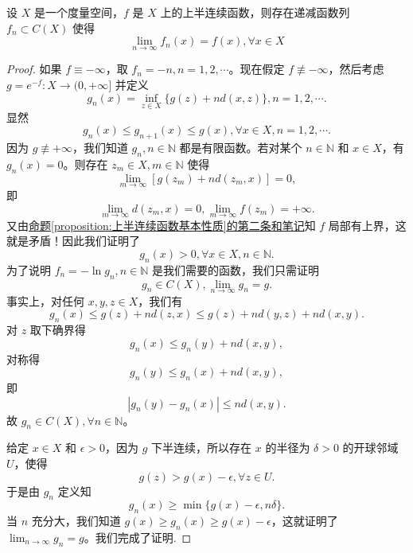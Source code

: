\documentclass[lang=cn,newtx,10pt,scheme=chinese]{elegantbook}
\begin{document}
\begin{theorem}[半连续函数逼近定理]\label{theorem:半连续函数逼近定理}
设 \(X\) 是一个度量空间，\(f\) 是 \(X\) 上的上半连续函数，则存在递减函数列 \(f_{n} \subset C(X)\) 使得
\[
\lim_{n \to \infty} f_{n}(x)=f(x),\forall x \in X
\]
\end{theorem}
\begin{proof}
如果 \(f\equiv -\infty\)，取 \(f_{n}=-n,n = 1,2,\cdots\)。现在假定 \(f\not\equiv -\infty\)，然后考虑 \(g = e^{-f}:X\to(0,+\infty]\) 并定义
\[
g_{n}(x)=\inf_{z\in X}\{g(z)+nd(x,z)\},n = 1,2,\cdots.
\]
显然
\[
g_{n}(x)\leq g_{n + 1}(x)\leq g(x),\forall x\in X,n = 1,2,\cdots.
\]
因为 \(g\not\equiv+\infty\)，我们知道 \(g_{n},n\in\mathbb{N}\) 都是有限函数。若对某个 \(n\in\mathbb{N}\) 和 \(x\in X\)，有 \(g_{n}(x)=0\)。则存在 \(z_{m}\in X,m\in\mathbb{N}\) 使得
\[
\lim_{m\to\infty}[g(z_{m})+nd(z_{m},x)] = 0,
\]
即
\[
\lim_{m\to\infty}d(z_{m},x)=0,\lim_{m\to\infty}f(z_{m})=+\infty.
\]
又由\hyperref[proposition:上半连续函数基本性质]{命题\ref{proposition:上半连续函数基本性质}的第二条和笔记}知 \(f\) 局部有上界，这就是矛盾！因此我们证明了
\[
g_{n}(x)>0,\forall x\in X,n\in\mathbb{N}.
\]
为了说明 \(f_{n}=-\ln g_{n},n\in\mathbb{N}\) 是我们需要的函数，我们只需证明
\[
g_{n}\in C(X),\lim_{n\to\infty}g_{n}=g.
\]
事实上，对任何 \(x,y,z\in X\)，我们有
\[
g_{n}(x)\leq g(z)+nd(z,x)\leq g(z)+nd(y,z)+nd(x,y).
\]
对 \(z\) 取下确界得
\[
g_{n}(x)\leq g_{n}(y)+nd(x,y),
\]
对称得
\[
g_{n}(y)\leq g_{n}(x)+nd(x,y),
\]
即
\[
|g_{n}(y)-g_{n}(x)|\leq nd(x,y).
\]
故 \(g_{n}\in C(X),\forall n\in\mathbb{N}\)。

给定 \(x\in X\) 和 \(\epsilon>0\)，因为 \(g\) 下半连续，所以存在 \(x\) 的半径为 \(\delta>0\) 的开球邻域 \(U\)，使得
\[
g(z)>g(x)-\epsilon,\forall z\in U.
\]
于是由 \(g_{n}\) 定义知
\[
g_{n}(x)\geq\min\{g(x)-\epsilon,n\delta\}.
\]
当 \(n\) 充分大，我们知道 \(g(x)\geq g_{n}(x)\geq g(x)-\epsilon\)，这就证明了 \(\lim_{n\to\infty}g_{n}=g\)。我们完成了证明.
\end{proof}
\end{document}
